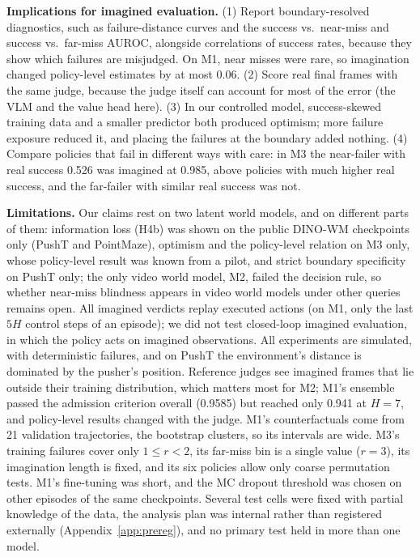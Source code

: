 \documentclass[10pt]{article}
\begin{document}
\textbf{Implications for imagined evaluation.} (1) Report boundary-resolved diagnostics, such as failure-distance curves and the success vs.\ near-miss and success vs.\ far-miss AUROC, alongside correlations of success rates, because they show which failures are misjudged. On M1, near misses were rare, so imagination changed policy-level estimates by at most 0.06. (2) Score real final frames with the same judge, because the judge itself can account for most of the error (the VLM and the value head here). (3) In our controlled model, success-skewed training data and a smaller predictor both produced optimism; more failure exposure reduced it, and placing the failures at the boundary added nothing. (4) Compare policies that fail in different ways with care: in M3 the near-failer with real success 0.526 was imagined at 0.985, above policies with much higher real success, and the far-failer with similar real success was not.

\textbf{Limitations.} Our claims rest on two latent world models, and on different parts of them: information loss (H4b) was shown on the public DINO-WM checkpoints only (PushT and PointMaze), optimism and the policy-level relation on M3 only, whose policy-level result was known from a pilot, and strict boundary specificity on PushT only; the only video world model, M2, failed the decision rule, so whether near-miss blindness appears in video world models under other queries remains open. All imagined verdicts replay executed actions (on M1, only the last $5H$ control steps of an episode); we did not test closed-loop imagined evaluation, in which the policy acts on imagined observations. All experiments are simulated, with deterministic failures, and on PushT the environment's distance is dominated by the pusher's position. Reference judges see imagined frames that lie outside their training distribution, which matters most for M2; M1's ensemble passed the admission criterion overall (0.9585) but reached only 0.941 at $H=7$, and policy-level results changed with the judge. M1's counterfactuals come from 21 validation trajectories, the bootstrap clusters, so its intervals are wide. M3's training failures cover only $1\le r<2$, its far-miss bin is a single value ($r=3$), its imagination length is fixed, and its six policies allow only coarse permutation tests. M1's fine-tuning was short, and the MC dropout threshold was chosen on other episodes of the same checkpoints. Several test cells were fixed with partial knowledge of the data, the analysis plan was internal rather than registered externally (Appendix~\ref{app:prereg}), and no primary test held in more than one model.
\end{document}
